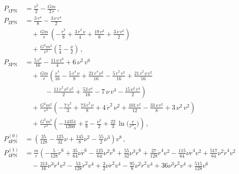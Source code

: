 \documentclass[prd,preprint,superscriptaddress,tightenlines,nofootinbib,
  eqsecnum,showpacs]{revtex4}
\begin{document}
\begin{subequations}\label{P}
\begin{align}
P_\text{1PN} &= \frac{v^2}{2} -\frac{G m}{2\,r}\,,\\
P_\text{2PN} &= \frac{3\,v^4}{8} - \frac{3\,\nu\,v^4}{2}
\nonumber\\ & \quad+ \frac{G m}{r}\,\left( -\frac{\dot{r}^2}{8} +
\frac{3\,\dot{r}^2\,\nu}{4} + \frac{19\,v^2}{8} +
\frac{3\,\nu\,v^2}{2} \right)\nonumber\\ &
\quad+\frac{G^2m^2}{r^2}\left(\frac{7}{4} - \frac{\nu}{2} \right)\,,\\
P_\text{3PN} &= \frac{5\,v^6}{16} -
  \frac{11\,\nu\,v^6}{4} + 6\,\nu^2\,v^6 \nonumber\\ & \quad
  +\frac{G m}{r}\left( \frac{\dot{r}^4}{16} -
  \frac{5\,\dot{r}^4\,\nu}{8} + \frac{21\,\dot{r}^4\,\nu^2}{16} -
  \frac{5\,\dot{r}^2\,v^2}{16} + \frac{21\,\dot{r}^2\,\nu\,v^2}{16}
  \right.\nonumber\\ & \quad\quad\quad -\left.
  \frac{11\,\dot{r}^2\,\nu^2\,v^2}{2} + \frac{53\,v^4}{16} -
  7\,\nu\,v^4 - \frac{15\,\nu^2\,v^4}{2} \right) \nonumber\\ & \quad
  +\frac{G^2m^2}{r^2}\left( -\frac{7\,\dot{r}^2}{3} +
  \frac{73\,\dot{r}^2\,\nu}{8} + 4\,\dot{r}^2\,\nu^2 +
  \frac{101\,v^2}{12} - \frac{33\,\nu\,v^2}{8} + 3\,\nu^2\,v^2 \right)
  \nonumber\\ & \quad + \frac{G^3m^3}{r^3}\left( -\frac{14351}{1260} +
  \frac{\nu}{8} - \frac{\nu^2}{2} + \frac{22}{3}\,\ln
  \Big(\frac{r}{r''_0}\Big) \right)\,,\\ 
P^{(0)}_\text{4PN} &= \left(\frac{35}{128}
 -  \frac{125}{32} \nu
 + \frac{145}{8} \nu^2
 -  \frac{55}{2} \nu^3\right) v^{8}
 \,,\\
P^{(1)}_\text{4PN} &= \frac{m}{r} \left(- \frac{5}{128} \dot{r}^6
 + \frac{35}{64} \nu \dot{r}^6
 -  \frac{125}{64} \nu^2 \dot{r}^6
 + \frac{55}{32} \nu^3 \dot{r}^6
 + \frac{27}{128} \dot{r}^4 v^{2}
 -  \frac{115}{64} \nu \dot{r}^4 v^{2}
 + \frac{517}{64} \nu^2 \dot{r}^4 v^{2}\right.\nonumber\\
& \quad-  \frac{213}{16} \nu^3 \dot{r}^4 v^{2}
 -  \frac{53}{128} \dot{r}^2 v^{4}
 + \frac{3}{2} \nu \dot{r}^2 v^{4}
 -  \frac{95}{8} \nu^2 \dot{r}^2 v^{4}
 + 36 \nu^3 \dot{r}^2 v^{4}
 + \frac{515}{128} v^{6}

\end{align}
\end{subequations}
\end{document}
